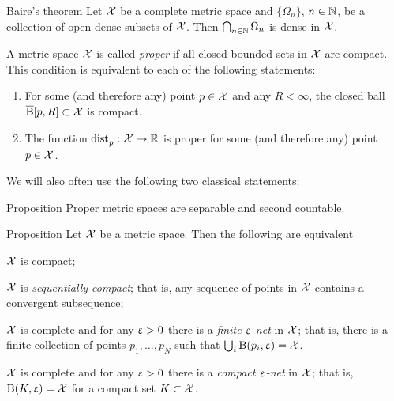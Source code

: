 \begin{thm}{Baire's theorem}
Let $\mathcal{X}$ be a complete metric space 
and $\{\Omega_n\}$, $n\in \NN$, be a collection of open dense subsets of $\mathcal{X}$.
Then $\bigcap_{n\in \NN}\Omega_n$ is dense in $\mathcal{X}$.
\end{thm}
 

A metric space $\mathcal{X}$ is called \emph{proper} if all closed bounded sets in $\mathcal{X}$ are compact. 
This condition is equivalent to each of the following statements:
\begin{enumerate}
\item For some (and therefore any) point $p\in \spc{X}$ and any $R<\infty$, 
the closed ball $\cBall[p,R]\subset\spc{X}$ is compact. 
\item The function $\distfun{p}{}{}\:\spc{X}\to\RR$ is proper for some (and therefore any) point $p\in \spc{X}$.
\end{enumerate}

We will also often use the following two classical statements:

\begin{thm}{Proposition}
Proper metric spaces are separable and second countable.
\end{thm}



\begin{thm}{Proposition}\label{compact=seq-compact}
Let $\mathcal{X}$ be a metric space.
Then the following are equivalent

\begin{subthm}{}
$\mathcal{X}$ is compact;
\end{subthm}

\begin{subthm}{}
$\mathcal{X}$ is \emph{sequentially compact}; that is, any sequence of points in $\mathcal{X}$ contains a convergent subsequence;
\end{subthm}

\begin{subthm}{}
$\mathcal{X}$ is complete and for any $\upvarepsilon>0$ there is a \emph{finite $\upvarepsilon$-net} in $\mathcal{X}$; that is, there is a finite collection of points $p_1,\ldots,p_{N}$ such that $\bigcup_i\mathrm{B}{}(p_i,\upvarepsilon)=\mathcal{X}$.
\end{subthm}

\begin{subthm}{}
$\mathcal{X}$ is complete and for any $\upvarepsilon>0$ there is a {}\emph{compact $\upvarepsilon$-net} in $\mathcal{X}$; that is, $\mathrm{B}{}(K,\upvarepsilon)=\mathcal{X}$ for a compact set $K\subset \spc{X}$.
\end{subthm}

\end{thm}

